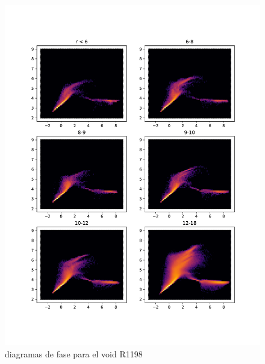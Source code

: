 \begin{figure}[h]
\centering
\includegraphics[width=15cm]{Figures/R1198_DF1.pdf}
\decoRule
\caption[asd]{diagramas de fase para el void R1198}
\label{fig:Electron}
\end{figure}

